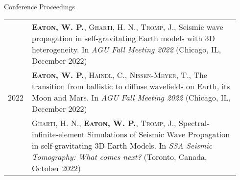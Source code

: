 \documentclass{resume}
\begin{document}
\begin{rSection}{Conference Proceedings}
\begin{tabular}{p{0.07\linewidth} | p{0.87\linewidth}}
\multirow{3}{*}{2022}  &  \textsc{\textbf{Eaton, W. P.}, Gharti, H. N., Tromp, J}., Seismic wave propagation in self-gravitating Earth models with 3D  heterogeneity. In \textit{AGU Fall Meeting 2022} (Chicago, IL, December 2022) \vspace{0.15cm} \\ &  \textsc{\textbf{Eaton, W. P.}, Haindl, C., Nissen-Meyer, T}., The transition from ballistic to diffuse wavefields on Earth, its Moon and Mars. In \textit{AGU Fall Meeting 2022} (Chicago, IL, December 2022) \vspace{0.15cm} \\ & \textsc{Gharti, H. N., \textbf{Eaton, W. P.}, Tromp, J}., Spectral-infinite-element Simulations of Seismic Wave Propagation in self-gravitating 3D Earth Models. In \textit{SSA Seismic Tomography: What comes next?} (Toronto, Canada, October 2022) \\
\end{tabular}

\end{rSection}
\end{document}
